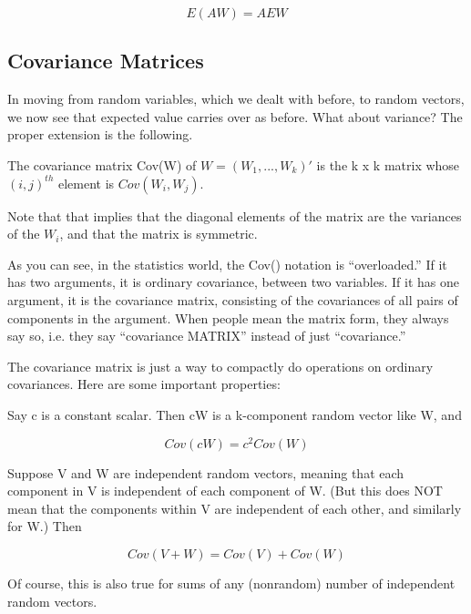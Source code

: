 \begin{equation}
\label{eaw}
E(AW) = A EW
\end{equation}

\subsection{Covariance Matrices}

In moving from random variables, which we dealt with before, to random
vectors, we now see that expected value carries over as before.  What
about variance?  The proper extension is the following.

\begin{definition}
\label{covmatdef}
The covariance matrix Cov(W) of $W = (W_1,...,W_k)'$
is the k x k matrix whose $(i,j)^{th}$ element is $Cov(W_i,W_j)$.  
\end{definition}

Note that that implies that the diagonal elements of the matrix are the
variances of the $W_i$, and that the matrix is symmetric.  

As you can see, in the statistics world, the Cov() notation is
``overloaded.''  If it has two arguments, it is ordinary covariance,
between two variables.  If it has one argument, it is the covariance
matrix, consisting of the covariances of all pairs of components in the
argument.  When people mean the matrix form, they always say so, i.e.
they say ``covariance MATRIX'' instead of just ``covariance.''

The covariance matrix is just a way to compactly do operations on
ordinary covariances.  Here are some important properties:

Say c is a constant scalar.  Then cW is a
k-component random vector like W, and 

\begin{equation}
\label{c2cov}
Cov(cW) = c^2 Cov(W)
\end{equation}

Suppose V and W are independent random vectors, meaning that each
component in V is independent of each component of W.  (But this does
NOT mean that the components within V are independent of each other, and
similarly for W.)  Then

\begin{equation}
\label{vectorsumcov}
Cov(V + W) = Cov(V) + Cov(W) 
\end{equation}

Of course, this is also true for sums of any (nonrandom) number of
independent random vectors.

